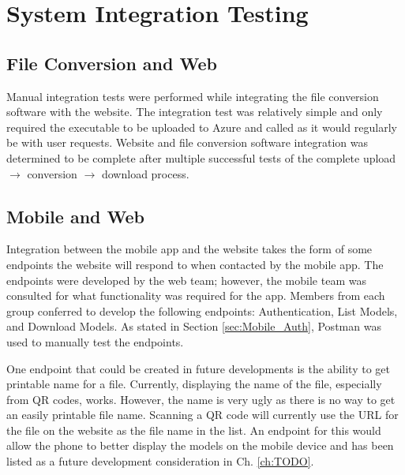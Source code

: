 
\section{System Integration Testing}

	\subsection{File Conversion and Web}
		
		Manual integration tests were performed while integrating the file conversion software with the website. The integration test was relatively simple and only required the executable to be uploaded to Azure and called as it would regularly be with user requests. Website and file conversion software integration was determined to be complete after multiple successful tests of the complete upload $\rightarrow$ conversion $\rightarrow$ download process.

	\subsection{Mobile and Web}

		Integration between the mobile app and the website takes the form of some endpoints the website will respond to when contacted by the mobile app. The endpoints were developed by the web team; however, the mobile team was consulted for what functionality was required for the app. Members from each group conferred to develop the following endpoints: Authentication, List Models, and Download Models.  As stated in Section \ref{sec:Mobile_Auth}, Postman was used to manually test the endpoints.

		One endpoint that could be created in future developments is the ability to get printable name for a file.  Currently, displaying the name of the file, especially from QR codes, works.  However, the name is very ugly as there is no way to get an easily printable file name.  Scanning a QR code will currently use the URL for the file on the website as the file name in the list. An endpoint for this would allow the phone to better display the models on the mobile device and has been listed as a future development consideration in Ch. \ref{ch:TODO}. 